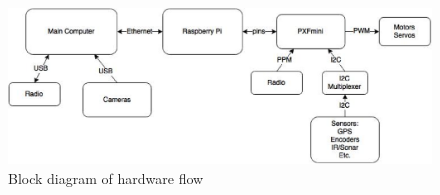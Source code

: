 \documentclass[compsoc,draftclsnofoot,onecolumn,10pt]{IEEEtran}
\begin{document}
\begin{figure}
  \centering
  \includegraphics[width=\textwidth]{Block_Diagram_1_.eps}
  \caption{Block diagram of hardware flow}
\end{figure}


%
\end{document}
